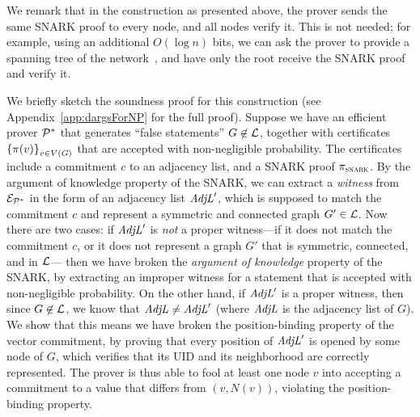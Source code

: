 	We remark that in the construction as presented above, the prover sends the same SNARK proof to every node,
	and all nodes verify it. This is not needed;
	for example, 
	using an additional $O(\log n)$ bits,
	we can ask the prover to provide a spanning tree of the network~\cite{korman2005proof},
	and have only the root receive the SNARK proof and verify it.

We briefly sketch the soundness proof for this construction (see Appendix~\ref{app:dargsForNP} for the full proof).
Suppose we have an efficient prover $\mathcal{P}^*$ that generates ``false statements''
$G \not \in \mathcal{L}$,
together with certificates $\left \{{\pi(v)} \right \}_{v \in V(G)}$
that are accepted with non-negligible probability.
The certificates include a commitment $c$ to an adjacency list, and a SNARK proof $\pi_\textsc{snark}$.
By the argument of knowledge property of the SNARK, we can extract a \emph{witness} from $\mathcal{E}_{\mathcal{P}^*}$ in the form of an adjacency list $\mathit{ AdjL }'$,
which is supposed to match the commitment $c$ and represent a symmetric and connected graph $G' \in \mathcal{L}$.
Now there are two cases:
if $\mathit{ AdjL }'$ is \emph{not} a proper witness---if it does not match the commitment $c$,
or it does not represent a graph $G'$ that is symmetric, connected, and in $\mathcal{L}$---%
then we have broken the \emph{argument of knowledge} property of the SNARK,
by extracting an improper witness for a statement that is accepted with non-negligible probability.
On the other hand, if $\mathit{ AdjL }'$ is a proper witness,
then since $G \not \in \mathcal{L}$, we know that $\mathit{ AdjL } \neq \mathit{ AdjL }'$ (where $\mathit{ AdjL }$
is the adjacency list of $G$).
We show that this means we have broken the position-binding property of the vector commitment,
by proving that every position of $\mathit{ AdjL }'$ is opened by some node of $G$,
which verifies that its UID and its neighborhood are correctly represented.
The prover is thus able to fool at least one node $v$ into accepting a commitment to
a value that differs from $(v, N(v))$,
violating the position-binding property.

